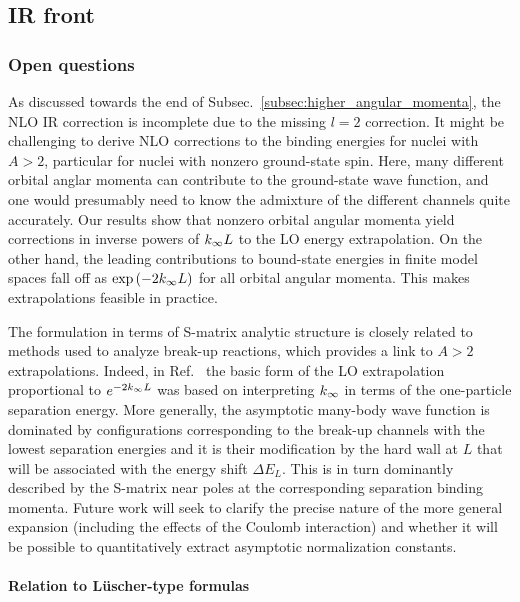 	\subsection{IR front}
	\label{subsec:IR_front}

  \medskip
	\subsubsection{Open questions}

	As discussed towards the end of Subsec.~\ref{subsec:higher_angular_momenta},
	the NLO IR correction is incomplete due to the missing $l=2$ correction.
	It might be challenging to derive NLO corrections to the binding
	energies for nuclei with $A> 2$, particular for nuclei with nonzero
	ground-state spin.  Here, many different orbital anglar momenta can
	contribute to the ground-state wave function, and one would presumably
	need to know the admixture of the different channels quite accurately.
	Our results show that nonzero orbital angular momenta yield
	corrections in inverse powers of $k_{\infty} L$ to the LO energy
	extrapolation.  On the other hand, the leading contributions to
	bound-state energies in finite model spaces fall off as $\exp{(-2\ensuremath{k_{\infty}}L)}$ for all orbital angular momenta.  This makes extrapolations
	feasible in practice.

	The formulation in terms of S-matrix analytic structure is closely
	related to methods used to analyze break-up reactions, which provides a
	link to $A>2$ extrapolations.  Indeed, in Ref.~\cite{Furnstahl:2012qg}
	the basic form of the LO extrapolation proportional to $e^{-2k_{\infty} L}$
	was based on interpreting $k_{\infty}$ in terms of the one-particle
	separation energy.  More generally, the asymptotic many-body wave
	function is dominated by configurations corresponding to the break-up
	channels with the lowest separation energies and it is
	their modification by the hard wall at $L$ that will be associated
	with the energy shift $\Delta E_L$.  This is in turn dominantly
	described by the S-matrix near poles at the corresponding separation
	binding momenta.  Future work will seek to clarify the precise nature
	of the more general expansion (including the effects of the Coulomb
	interaction) and whether it will be possible to quantitatively extract
	asymptotic normalization constants.

	\paragraph{Relation to L\"{u}scher-type formulas}

